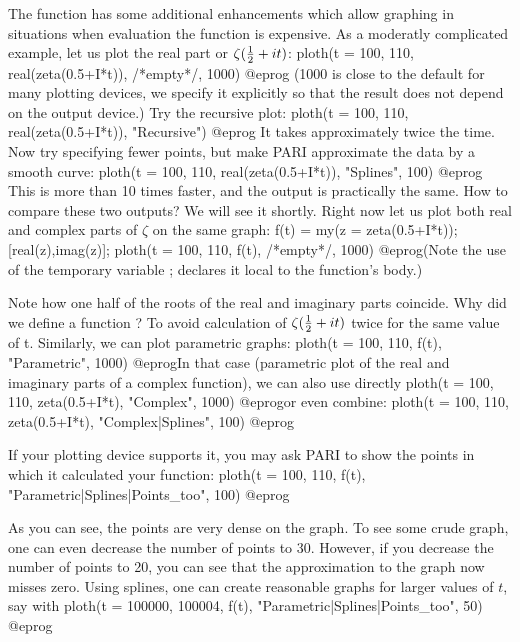 The function  has some additional enhancements which allow
graphing in situations when evaluation the function is expensive.
As a moderatly complicated example, let us plot the real part or
$\zeta({1\over 2} + it)$:
\bprog
  ploth(t = 100, 110, real(zeta(0.5+I*t)), /*empty*/, 1000)
@eprog\noindent
(1000 is close to the default for many plotting devices, we specify it
explicitly so that the result does not depend on the output device.)  Try the
recursive plot:
\bprog
  ploth(t = 100, 110, real(zeta(0.5+I*t)), "Recursive")
@eprog\noindent
It takes approximately twice the time.  Now try specifying fewer points,
but make PARI approximate the data by a smooth curve:
\bprog
  ploth(t = 100, 110, real(zeta(0.5+I*t)), "Splines", 100)
@eprog\noindent
This is more than 10 times faster, and the output is practically the same.
How to compare these two outputs?  We will see it shortly.
Right now let us plot both real and complex parts of $\zeta$ on the same graph:
\bprog
  f(t) = my(z = zeta(0.5+I*t)); [real(z),imag(z)];
  ploth(t = 100, 110, f(t), /*empty*/, 1000)
@eprog\noindent (Note the use of the temporary variable ; 
declares it local to the function's body.)

Note how one half of the roots of the real and imaginary parts coincide.
Why did we define a function ?  To avoid calculation of
$\zeta({1\over2} + it)$ twice for the same value of t.  Similarly, we can
plot parametric graphs:
\bprog
  ploth(t = 100, 110, f(t), "Parametric", 1000)
@eprog\noindent In that case (parametric plot of the real and imaginary parts
of a complex function), we can also use directly
\bprog
  ploth(t = 100, 110, zeta(0.5+I*t), "Complex", 1000)
@eprog\noindent or even combine:
\bprog
  ploth(t = 100, 110, zeta(0.5+I*t), "Complex|Splines", 100)
@eprog

If your plotting device supports it, you may ask PARI to show the points
in which it calculated your function:
\bprog
  ploth(t = 100, 110, f(t), "Parametric|Splines|Points_too", 100)
@eprog

As you can see, the points are very dense on the graph.  To see some crude
graph, one can even decrease the number of points to 30.  However, if you
decrease the number of points to 20, you can see that the approximation to
the graph now misses zero.  Using splines, one can create reasonable graphs
for larger values of $t$, say with
\bprog
  ploth(t = 100000, 100004, f(t), "Parametric|Splines|Points_too", 50)
@eprog


